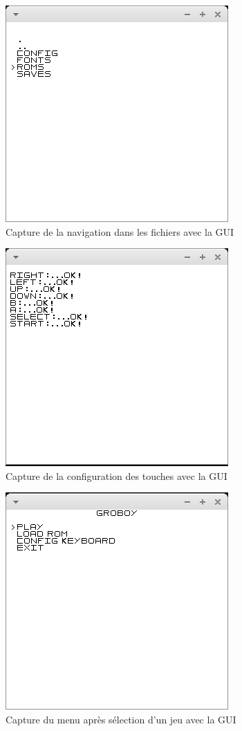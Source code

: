 \documentclass{report}
\begin{document}
\begin{figure}[!h]
\centering
\includegraphics[scale=0.5]{images/screenshot_navigate.png}
\caption{Capture de la navigation dans les fichiers avec la GUI}
\label{GUI2}
\end{figure}

\begin{figure}[!h]
\centering
\includegraphics[scale=0.5]{images/screenshot_config.png}
\caption{Capture de la configuration des touches avec la GUI}
\label{GUI3}
\end{figure}

\begin{figure}[!h]
\centering
\includegraphics[scale=0.5]{images/screenshot_menu2.png}
\caption{Capture du menu après sélection d'un jeu avec la GUI}
\label{GUI4}
\end{figure}
\end{document}
